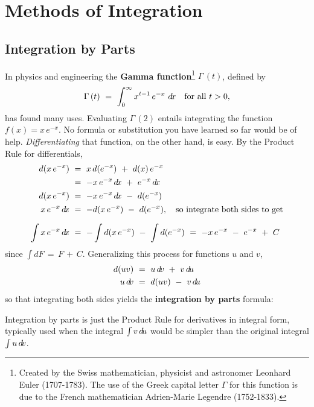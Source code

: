 \chapter{Methods of Integration}
\section{Integration by Parts}
In physics and engineering the
\textbf{Gamma function}\footnote{Created by the Swiss
mathematician, physicist and astronomer Leonhard Euler (1707-1783). The use of
the Greek capital letter $\Gamma$ for this function is due to the French
mathematician Adrien-Marie Legendre (1752-1833).}
 $\Gamma\,(t)$, defined by
\[
\Gamma\,(t) ~=~ \int_0^{\infty} x^{t-1} \, e^{-x} ~d\!x \quad\text{for all $t > 0$,}
\]
has found many uses. Evaluating $\Gamma\,(2)$ entails integrating the function
$f(x) = x\,e^{-x}$. No formula or substitution you have learned so far would be
of help. \emph{Differentiating} that function, on the other hand, is easy. By
the Product Rule for differentials,
\begin{align*}
d(x\,e^{-x}) ~&=~ x\,d(e^{-x}) ~+~ d(x)\,e^{-x}\\
&=~ -x\,e^{-x}\,d\!x ~+~ e^{-x}\,d\!x\\
d(x\,e^{-x}) ~&=~ -x\,e^{-x}\,d\!x ~-~ d(e^{-x})\\
x\,e^{-x}\,d\!x ~&=~ -d(x\,e^{-x}) ~-~ d(e^{-x}),\quad\text{so integrate both sides to get}\\[6pt]
\int x\,e^{-x}\,d\!x ~&=~ -\int d(x\,e^{-x}) ~-~ \int d(e^{-x})
~=~ -x\,e^{-x} ~-~ e^{-x} ~+~ C
\end{align*}
since $\int d\!F \,=\, F \,+\, C$. Generalizing this process for functions $u$
and $v$,
\begin{align*}
d(uv) ~&=~ u\,d\!v ~+~ v\,d\!u\\
u\,d\!v ~&=~ d(uv) ~-~ v\,d\!u
\end{align*}
so that integrating both sides yields the \textbf{integration by parts}
formula:

Integration by parts is just the Product Rule for derivatives in integral form,
typically used when the integral $\int v\,d\!u$ would be simpler than the
original integral $\int u\,d\!v$.

